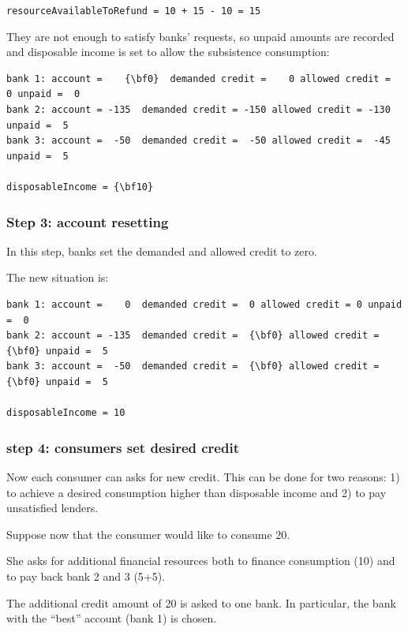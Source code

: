 \documentclass{article}
\begin{document}
\verb/resourceAvailableToRefund = 10 + 15 - 10 = 15/

They are not enough to satisfy banks' requests, so unpaid amounts are recorded and disposable income is set to allow the subsistence consumption:

\begin{Verbatim}[commandchars=\\\{\}]
bank 1: account =    {\bf0}  demanded credit =    0 allowed credit =    0 unpaid =  0
bank 2: account = -135  demanded credit = -150 allowed credit = -130 unpaid =  5
bank 3: account =  -50  demanded credit =  -50 allowed credit =  -45 unpaid =  5

disposableIncome = {\bf10}
\end{Verbatim}

\subsubsection*{Step 3: account resetting}
In this step, banks set the demanded and allowed credit to zero.

The new situation is:

\begin{Verbatim}[commandchars=\\\{\}]
bank 1: account =    0  demanded credit =  0 allowed credit = 0 unpaid =  0
bank 2: account = -135  demanded credit =  {\bf0} allowed credit = {\bf0} unpaid =  5
bank 3: account =  -50  demanded credit =  {\bf0} allowed credit = {\bf0} unpaid =  5

disposableIncome = 10
\end{Verbatim}




\subsubsection*{step 4: consumers set desired credit}
Now each consumer can asks for new credit. This can be done for two reasons: 1) to achieve a desired consumption higher than disposable income and 2) to pay unsatisfied lenders.

Suppose now that the consumer would like to consume 20.

She asks for additional financial resources both to finance consumption (10) and to pay back bank 2 and 3 (5+5).

The additional credit amount of 20 is asked to one bank. In particular, the bank with the ``best'' account (bank 1) is chosen. 
\end{document}

